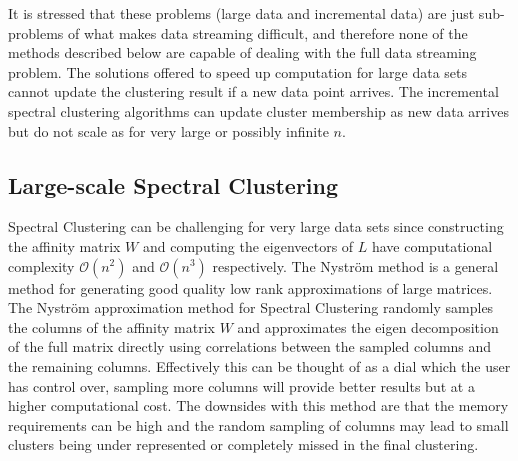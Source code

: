 It is stressed that these problems (large data and incremental data) are just sub-problems of what makes data streaming difficult, and therefore none of the methods described below are capable of dealing with the full data streaming problem. The solutions offered to speed up computation for large data sets cannot update the clustering result if a new data point arrives. The incremental spectral clustering algorithms can update cluster membership as new data arrives but do not scale as for very large or possibly infinite $n$. %

\subsection{Large-scale Spectral Clustering}
\label{sec:big_data}

Spectral Clustering can be challenging for very large data sets since constructing the affinity matrix $W$ and computing the eigenvectors of $L$ have computational complexity $\mathcal{O}(n^2)$ and $\mathcal{O}(n^3)$ respectively. The Nystr\"{o}m method \citep{Williams2001} is a general method for generating good quality low rank approximations of large matrices. The Nystr\"{o}m approximation method for Spectral Clustering \citep{Fowlkes2004} randomly samples the columns of the affinity matrix $W$ and approximates the eigen decomposition of the full matrix directly using correlations between the sampled columns and the remaining columns. Effectively this can be thought of as a dial which the user has control over, sampling more columns will provide better results but at a higher computational cost. The downsides with this method are that the  memory requirements can be high and the random sampling of columns may lead to small clusters being under represented or completely missed in the final clustering. 

